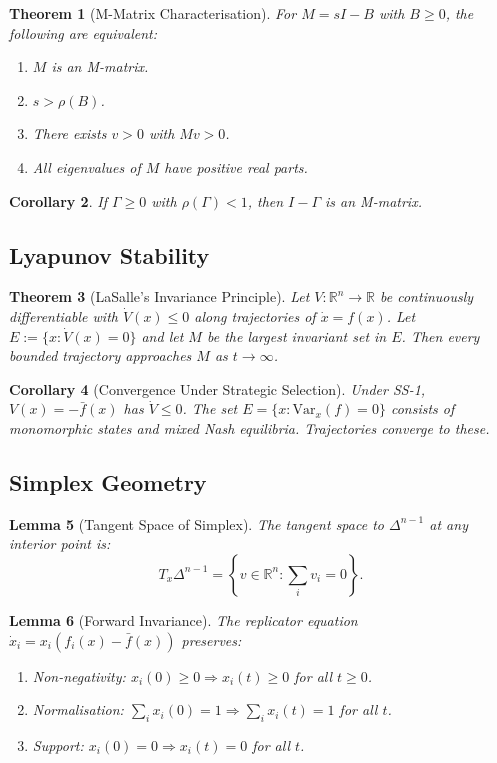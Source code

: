 \documentclass[12pt]{article}
\newtheorem{theorem}{Theorem}[section]
\newtheorem{lemma}[theorem]{Lemma}
\newtheorem{corollary}[theorem]{Corollary}
\newcommand{\R}{\mathbb{R}}
\newcommand{\Var}{\mathrm{Var}}
\begin{document}
\begin{theorem}[M-Matrix Characterisation]
\label{thm:m-matrix}
For $M = sI - B$ with $B \geq 0$, the following are equivalent:
\begin{enumerate}
    \item $M$ is an M-matrix.
    \item $s > \rho(B)$.
    \item There exists $v > 0$ with $Mv > 0$.
    \item All eigenvalues of $M$ have positive real parts.
\end{enumerate}
\end{theorem}

\begin{corollary}
If $\Gamma \geq 0$ with $\rho(\Gamma) < 1$, then $I - \Gamma$ is an M-matrix.
\end{corollary}

\subsection{Lyapunov Stability}

\begin{theorem}[LaSalle's Invariance Principle]
\label{thm:lasalle}
Let $V: \R^n \to \R$ be continuously differentiable with $\dot{V}(x) \leq 0$ along trajectories of $\dot{x} = f(x)$. Let $E := \{x : \dot{V}(x) = 0\}$ and let $M$ be the largest invariant set in $E$. Then every bounded trajectory approaches $M$ as $t \to \infty$.
\end{theorem}

\begin{corollary}[Convergence Under Strategic Selection]
Under SS-1, $V(x) = -\bar{f}(x)$ has $\dot{V} \leq 0$. The set $E = \{x : \Var_x(f) = 0\}$ consists of monomorphic states and mixed Nash equilibria. Trajectories converge to these.
\end{corollary}

\subsection{Simplex Geometry}

\begin{lemma}[Tangent Space of Simplex]
\label{lem:tangent-simplex}
The tangent space to $\Delta^{n-1}$ at any interior point is:
\[
T_x \Delta^{n-1} = \left\{ v \in \R^n : \sum_i v_i = 0 \right\}.
\]
\end{lemma}

\begin{lemma}[Forward Invariance]
\label{lem:forward-invariance}
The replicator equation $\dot{x}_i = x_i(f_i(x) - \bar{f}(x))$ preserves:
\begin{enumerate}
    \item Non-negativity: $x_i(0) \geq 0 \Rightarrow x_i(t) \geq 0$ for all $t \geq 0$.
    \item Normalisation: $\sum_i x_i(0) = 1 \Rightarrow \sum_i x_i(t) = 1$ for all $t$.
    \item Support: $x_i(0) = 0 \Rightarrow x_i(t) = 0$ for all $t$.
\end{enumerate}
\end{lemma}
\end{document}
